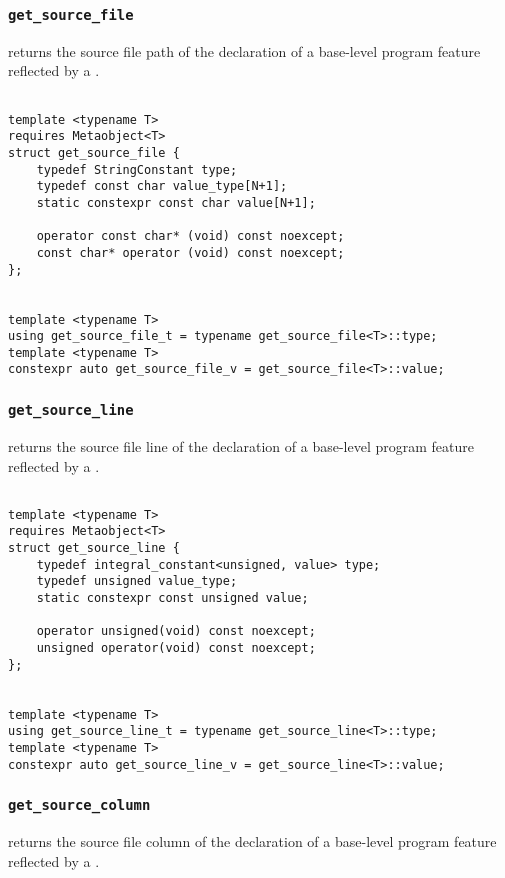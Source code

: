 
\subsubsection{\texttt{get\_source\_file}}

returns the source file path of the declaration of a base-level program feature reflected by a .

\begin{verbatim}

template <typename T>
requires Metaobject<T>
struct get_source_file {
	typedef StringConstant type;
	typedef const char value_type[N+1];
	static constexpr const char value[N+1];

	operator const char* (void) const noexcept;
	const char* operator (void) const noexcept;
};


template <typename T>
using get_source_file_t = typename get_source_file<T>::type;
template <typename T>
constexpr auto get_source_file_v = get_source_file<T>::value;

\end{verbatim}

\subsubsection{\texttt{get\_source\_line}}

returns the source file line of the declaration of a base-level program feature reflected by a .

\begin{verbatim}

template <typename T>
requires Metaobject<T>
struct get_source_line {
	typedef integral_constant<unsigned, value> type;
	typedef unsigned value_type;
	static constexpr const unsigned value;

	operator unsigned(void) const noexcept;
	unsigned operator(void) const noexcept;
};


template <typename T>
using get_source_line_t = typename get_source_line<T>::type;
template <typename T>
constexpr auto get_source_line_v = get_source_line<T>::value;

\end{verbatim}

\subsubsection{\texttt{get\_source\_column}}

returns the source file column of the declaration of a base-level program feature reflected by a .

